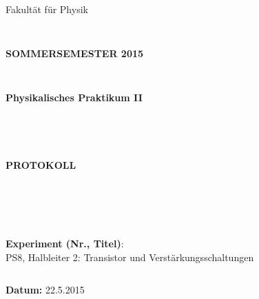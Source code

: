 \documentclass[12pt,a4paper,twopage]{article}
\begin{document}
\begin{verbatim}


\end{verbatim}

\thispagestyle{empty}
			\begin{center}
			\Large{Fakultät für Physik}\\
			\end{center}
\begin{verbatim}


\end{verbatim}
			\begin{center}
			\textbf{\LARGE SOMMERSEMESTER 2015}
			\end{center}
\begin{verbatim}


\end{verbatim}
			\begin{center}
			\textbf{\LARGE{Physikalisches Praktikum II}}
			\end{center}
\begin{verbatim}




\end{verbatim}

			\begin{center}
			\textbf{\LARGE{PROTOKOLL}}
			\end{center}
			
\begin{verbatim}





\end{verbatim}

			\begin{flushleft}
			\textbf{\Large{Experiment (Nr., Titel)}}:\\
			\Large{PS8, Halbleiter 2: Transistor und Verstärkungsschaltungen}\\
			\LARGE{}	
			\end{flushleft}

\begin{verbatim}

\end{verbatim}	
			\begin{flushleft}
			\textbf{\Large{Datum:}} \Large{22.5.2015}
			\end{flushleft}
			
\end{document}
